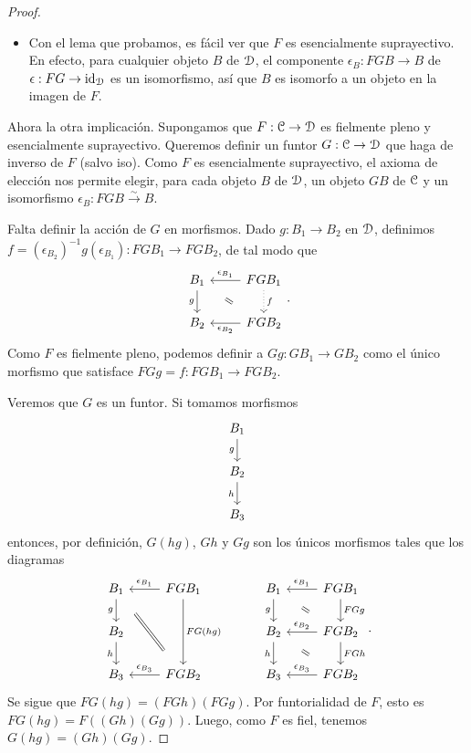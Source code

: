 \begin{proof}
\begin{itemize}
        \item
        Con el lema que probamos, es fácil ver que $F$ es
        esencialmente suprayectivo.
        En efecto, 
        para cualquier objeto $B$ de $\cal D$, el componente
        $\epsilon_B:FGB\to B$ de $\epsilon:FG\to\id_{\cal D}$ es un
        isomorfismo, así que $B$ es isomorfo a un objeto en la
        imagen de $F$.
    \end{itemize}
    Ahora la otra implicación.
    Supongamos que $F:\cal C\to\cal D$ es fielmente pleno
    y esencialmente suprayectivo.
    Queremos definir un funtor $G:\cal C\to \cal D$ que haga de
    inverso de $F$ (salvo iso).
    Como $F$ es esencialmente suprayectivo, el axioma de
    elección nos permite elegir, para cada objeto $B$ de $\cal D$,
    un objeto $GB$ de $\cal C$ y un isomorfismo
    $\epsilon_B:FGB\xrightarrow{\sim} B$.
    
    Falta definir la acción de $G$ en morfismos.
    Dado $g:B_1\to B_2$ en $\cal D$, definimos
    $f=(\epsilon_{B_2})^{-1}g(\epsilon_{B_1}):FGB_1\to FGB_2$, de tal
    modo que
    \[
        \begin{tikzcd}
            B_1 \ar[d,"g"']
            & FGB_1 \ar[l,"\epsilon_{B_1}"'] \ar[d,"f",dotted] \\
            B_2 & FGB_2 \ar[l,"\epsilon_{B_2}"]
            \com{1-1}{2-2}
        \end{tikzcd}
    .\]
    Como $F$ es fielmente pleno, podemos definir a $Gg:GB_1\to GB_2$
    como el único morfismo que satisface $FGg=f:FGB_1\to FGB_2$.
    
    Veremos que $G$ es un funtor.
    Si tomamos morfismos
    \[
        \begin{tikzcd}
            B_1 \ar[d,"g"'] \\
            B_2 \ar[d,"h"'] \\
            B_3
        \end{tikzcd}
    \]
    entonces, por definición, $G(hg)$, $Gh$ y $Gg$
    son los únicos morfismos tales que los diagramas
    \[
        \begin{tikzcd}
            B_1 \ar[d,"g"'] & FGB_1 \ar[l,"\epsilon_{B_1}"'] \ar[dd,"FG(hg)"] \\
            B_2 \ar[d,"h"'] \\
            B_3 & FGB_2 \ar[l,"\epsilon_{B_3}"']
            \com{1-1}{3-2}
        \end{tikzcd}
        \hspace{10mm}
        \begin{tikzcd}
            B_1 \ar[d,"g"'] & FGB_1 \ar[l,"\epsilon_{B_1}"'] \ar[d,"FGg"] \\
            B_2 \ar[d,"h"'] & FGB_2 \ar[l,"\epsilon_{B_2}"'] \ar[d,"FGh"] \\
            B_3 & FGB_2 \ar[l,"\epsilon_{B_3}"']
            \com{1-1}{2-2} \com{2-1}{3-2}
        \end{tikzcd}
    .\]
    Se sigue que $FG(hg)=(FGh)(FGg)$.
    Por funtorialidad de $F$, esto es $FG(hg)=F((Gh)(Gg))$.
    Luego, como $F$ es fiel, tenemos $G(hg)=(Gh)(Gg)$.
    

\end{proof}

